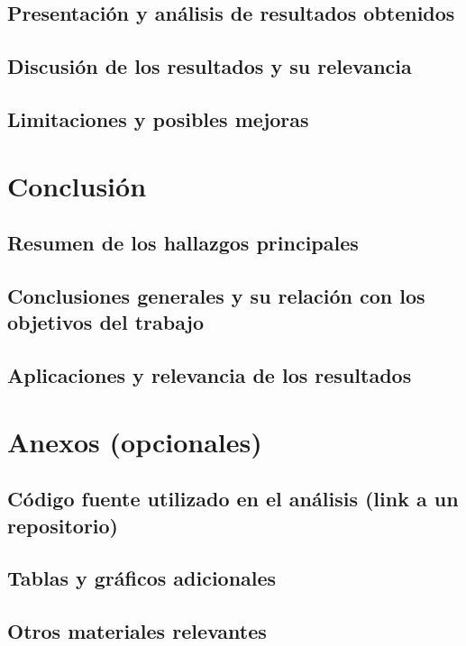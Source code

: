 \documentclass[a4paper]{report}
\begin{document}
\section{Presentación y análisis de resultados obtenidos}

\section{Discusión de los resultados y su relevancia}

\section{Limitaciones y posibles mejoras}





\chapter{Conclusión}

\section{Resumen de los hallazgos principales}

\section{Conclusiones generales y su relación con los objetivos del trabajo}

\section{Aplicaciones y relevancia de los resultados}


\printbibliography[heading=bibintoc] %



\chapter*{Anexos (opcionales)}

\section{Código fuente utilizado en el análisis (link a un repositorio)}
\section{Tablas y gráficos adicionales}
\section{Otros materiales relevantes}
\end{document}
